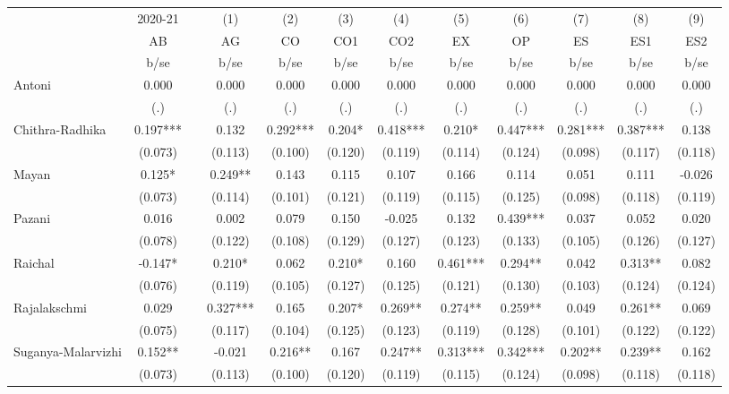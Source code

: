 \begin{table}[htbp]
  \centering
    \begin{tabular}{lcrccccccccc}
    \toprule
      & 2020-21 &   & (1) & (2) & (3) & (4) & (5) & (6) & (7) & (8) & (9) \\
      & AB &   & AG & CO & CO1 & CO2 & EX & OP & ES & ES1 & ES2 \\
      & b/se &   & b/se & b/se & b/se & b/se & b/se & b/se & b/se & b/se & b/se \\
    \midrule
    Antoni & 0.000 &   & 0.000 & 0.000 & 0.000 & 0.000 & 0.000 & 0.000 & 0.000 & 0.000 & 0.000 \\
      & (.) &   & (.) & (.) & (.) & (.) & (.) & (.) & (.) & (.) & (.) \\
    Chithra-Radhika & 0.197*** &   & 0.132 & 0.292*** & 0.204* & 0.418*** & 0.210* & 0.447*** & 0.281*** & 0.387*** & 0.138 \\
      & (0.073) &   & (0.113) & (0.100) & (0.120) & (0.119) & (0.114) & (0.124) & (0.098) & (0.117) & (0.118) \\
    Mayan & 0.125* &   & 0.249** & 0.143 & 0.115 & 0.107 & 0.166 & 0.114 & 0.051 & 0.111 & -0.026 \\
      & (0.073) &   & (0.114) & (0.101) & (0.121) & (0.119) & (0.115) & (0.125) & (0.098) & (0.118) & (0.119) \\
    Pazani & 0.016 &   & 0.002 & 0.079 & 0.150 & -0.025 & 0.132 & 0.439*** & 0.037 & 0.052 & 0.020 \\
      & (0.078) &   & (0.122) & (0.108) & (0.129) & (0.127) & (0.123) & (0.133) & (0.105) & (0.126) & (0.127) \\
    Raichal & -0.147* &   & 0.210* & 0.062 & 0.210* & 0.160 & 0.461*** & 0.294** & 0.042 & 0.313** & 0.082 \\
      & (0.076) &   & (0.119) & (0.105) & (0.127) & (0.125) & (0.121) & (0.130) & (0.103) & (0.124) & (0.124) \\
    Rajalakschmi & 0.029 &   & 0.327*** & 0.165 & 0.207* & 0.269** & 0.274** & 0.259** & 0.049 & 0.261** & 0.069 \\
      & (0.075) &   & (0.117) & (0.104) & (0.125) & (0.123) & (0.119) & (0.128) & (0.101) & (0.122) & (0.122) \\
    Suganya-Malarvizhi & 0.152** &   & -0.021 & 0.216** & 0.167 & 0.247** & 0.313*** & 0.342*** & 0.202** & 0.239** & 0.162 \\
      & (0.073) &   & (0.113) & (0.100) & (0.120) & (0.119) & (0.115) & (0.124) & (0.098) & (0.118) & (0.118) \\

\end{tabular}
\end{table}
